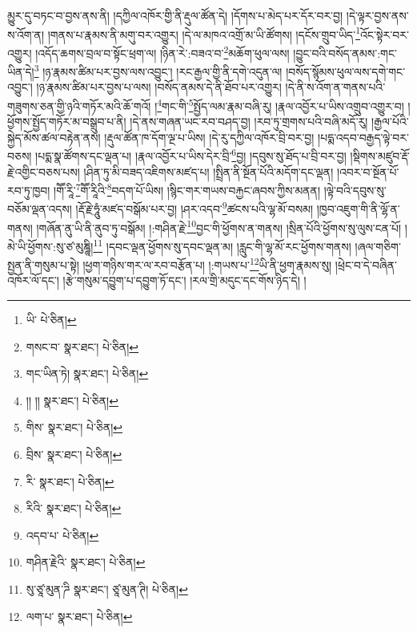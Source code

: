 མྱུར་དུ་བཏང་བ་བྱས་ནས་ནི། །དཀྱིལ་འཁོར་གྱི་ནི་རྡུལ་ཚོན་དེ། །དོགས་པ་མེད་པར་དོར་བར་བྱ། །དེ་ལྟར་བྱས་ནས་ས་འོག་ན། །གནས་པ་རྣམས་ནི་མགུ་བར་འགྱུར། །དེ་ལ་མཁའ་འགྲོ་མ་ཡི་ཚོགས། །དངོས་གྲུབ་ཡིད་\footnote{ཡི་  པེ་ཅིན། }འོང་སྟེར་བར་འགྱུར། །འདོད་ཆགས་བྲལ་བ་སྟོང་ཕྲག་ལ། །ཉིན་རེ་:བཟའ་བ་\footnote{གསང་བ་  སྣར་ཐང་།  པེ་ཅིན། }མཆོག་ཕུལ་ལས། །བྱུང་བའི་བསོད་ནམས་:གང་ཡིན་དེ།\footnote{གང་ཡིན་ཏེ།  སྣར་ཐང་།  པེ་ཅིན། } །ཉ་རྣམས་ཚིམ་པར་བྱས་ལས་འབྱུང་། །རང་རྒྱལ་གྱི་ནི་དགེ་འདུན་ལ། །བསོད་སྙོམས་ཕུལ་ལས་དགེ་གང་འབྱུང་། །ཉ་རྣམས་ཚིམ་པར་བྱས་པ་ལས། །བསོད་ནམས་དེ་ནི་ཐོབ་པར་འགྱུར། །དེ་ནི་ས་འོག་ན་གནས་པའི་གཟུགས་ཅན་གྱི་ཉའི་གཏོར་མའི་ཆོ་གའོ། །\footnote{།། །།  སྣར་ཐང་།  པེ་ཅིན། }གང་གི་\footnote{གིས་  སྣར་ཐང་།  པེ་ཅིན། }སྤྱོད་ལམ་རྣམ་བཞི་རུ། །རྣལ་འབྱོར་པ་ཡིས་འགྲུབ་འགྱུར་བ། །ཕྱོགས་སྤྱོད་གཏོར་མ་བསྒྲུབ་པ་ནི། །དེ་ནས་གཞན་ཡང་རབ་བཤད་བྱ། །རབ་ཏུ་གྲགས་པའི་བཞི་མདོ་རུ། །རྒྱལ་པོའི་སྐྱེད་མོས་ཚལ་བརྟེན་ནས། །རྡུལ་ཚོན་ཁ་དོག་ལྔ་པ་ཡིས། །དེ་རུ་དཀྱིལ་འཁོར་བྲི་བར་བྱ། །པདྨ་འདབ་བརྒྱད་ལྟེ་བར་བཅས། །པདྨ་སྣ་ཚོགས་དང་ལྡན་པ། །རྣལ་འབྱོར་པ་ཡིས་དེར་བྲི་\footnote{བྲིས་  སྣར་ཐང་།  པེ་ཅིན། }བྱ། །དབུས་སུ་ཐོད་པ་བྲི་བར་བྱ། །སྡིགས་མཛུབ་རྡོ་རྗེ་འགྱིང་བཅས་པས། །ཤིན་ཏུ་མི་བཟད་འཇིགས་མཛད་པ། །སྤྲིན་ནི་སྔོན་པོའི་མདོག་དང་ལྡན། །འབར་བ་སྔོན་པོ་རབ་ཏུ་ཁྱབ། །གཽ་རཱི་\footnote{རི་  སྣར་ཐང་།  པེ་ཅིན། }གཽ་རཱིའི་\footnote{རིའི་  སྣར་ཐང་།  པེ་ཅིན། }བདག་པོ་ཡིས། །སྙིང་གར་གཡས་བརྐྱང་ཞབས་ཀྱིས་མནན། །ལྟེ་བའི་དབུས་སུ་བཅོམ་ལྡན་འདས། །རྡོ་རྗེ་ཧཱུཾ་མཛད་བསྒོམ་པར་བྱ། །ཤར་འདབ་\footnote{འདབ་པ་  པེ་ཅིན། }ཚངས་པའི་ལྷ་མོ་བསམ། །ཁྱབ་འཇུག་གི་ནི་ལྷོ་ན་གནས། །གཞོན་ནུ་ཡི་ནི་ནུབ་ཏུ་བསྒོམ། །:གཤིན་རྗེ་\footnote{གཤིན་རྗེའི་  སྣར་ཐང་།  པེ་ཅིན། }བྱང་གི་ཕྱོགས་ན་གནས། །སྲིན་པོའི་ཕྱོགས་སུ་ལུས་ངན་པོ། །མེ་ཡི་ཕྱོགས་:སུ་ཙ་མུཎྜཱི།\footnote{སུ་ཙཱ་མུན་ཌི  སྣར་ཐང་། ཙཱ་མུན་ཊི།  པེ་ཅིན། } །དབང་ལྡན་ཕྱོགས་སུ་དབང་ལྡན་མ། །རླུང་གི་ལྷ་མོ་རང་ཕྱོགས་གནས། །ཞལ་གཅིག་སྤྱན་ནི་གསུམ་པ་སྟེ། །ཕྱག་གཉིས་གར་ལ་རབ་བརྩོན་པ། །:གཡས་པ་\footnote{ལག་པ་  སྣར་ཐང་།  པེ་ཅིན། }ཡི་ནི་ཕྱག་རྣམས་སུ། །ཕྲེང་བ་དེ་བཞིན་འཁོར་ལོ་དང་། །རྩེ་གསུམ་དབྱུག་པ་དབྱུག་ཏོ་དང་། །རལ་གྲི་མདུང་དང་གོས་ཉིད་དེ། །
